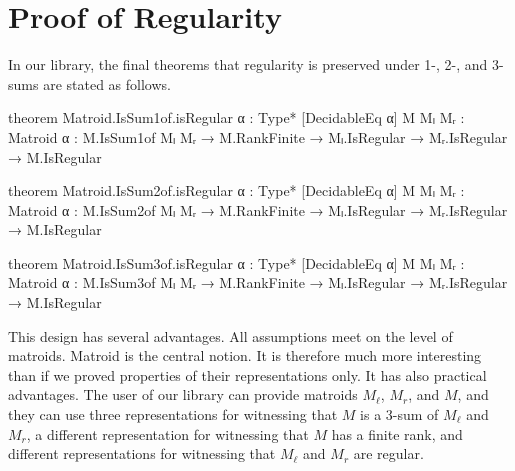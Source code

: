 \section{Proof of Regularity}

In our library, the final theorems that regularity is preserved under 1-, 2-, and 3-sums are stated as follows.
\begin{leancode}
theorem Matroid.IsSum1of.isRegular {α : Type*}
    [DecidableEq α] {M Mₗ Mᵣ : Matroid α} :
  M.IsSum1of Mₗ Mᵣ → M.RankFinite →
    Mₗ.IsRegular → Mᵣ.IsRegular → M.IsRegular
\end{leancode}
\begin{leancode}
theorem Matroid.IsSum2of.isRegular {α : Type*}
    [DecidableEq α] {M Mₗ Mᵣ : Matroid α} :
  M.IsSum2of Mₗ Mᵣ → M.RankFinite →
    Mₗ.IsRegular → Mᵣ.IsRegular → M.IsRegular
\end{leancode}
\begin{leancode}
theorem Matroid.IsSum3of.isRegular {α : Type*}
    [DecidableEq α] {M Mₗ Mᵣ : Matroid α} :
  M.IsSum3of Mₗ Mᵣ → M.RankFinite →
    Mₗ.IsRegular → Mᵣ.IsRegular → M.IsRegular
\end{leancode}
This design has several advantages.
All assumptions meet on the level of matroids.
Matroid is the central notion.
It is therefore much more interesting than if we proved properties of their representations only.
It has also practical advantages.
The user of our library can provide matroids $M_{\ell}$, $M_{r}$, and $M$, and they
can use three representations for witnessing that $M$ is a 3-sum of $M_{\ell}$ and $M_{r}$,
a different representation for witnessing that $M$ has a finite rank,
and different representations for witnessing that $M_{\ell}$ and $M_{r}$ are regular.

